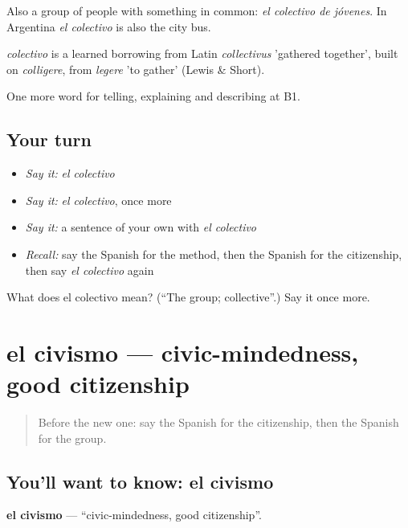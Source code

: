 Also a group of people with something in common: \emph{el colectivo de jóvenes}. In Argentina \emph{el colectivo} is also the city bus.

\begin{cousinweb}
\emph{colectivo} is a learned borrowing from Latin \emph{collectivus} 'gathered together', built on \emph{colligere}, from \emph{legere} 'to gather' (Lewis \& Short).
\end{cousinweb}

\begin{grammarlens}[title={What you've built}]
One more word for telling, explaining and describing at B1.
\end{grammarlens}

\subsection*{Your turn}
\begin{itemize}
\raggedright
  \item \emph{Say it:} \emph{el colectivo}
  \item \emph{Say it:} \emph{el colectivo}, once more
  \item \emph{Say it:} a sentence of your own with \emph{el colectivo}
  \item \emph{Recall:} say the Spanish for the method, then the Spanish for the citizenship, then say \emph{el colectivo} again
\end{itemize}

\begin{tcolorbox}[breakable,colback=teal!4,colframe=teal!35!black,title={Before you move on}]
What does el colectivo mean? (\textquotedblleft{}The group; collective\textquotedblright{}.) Say it once more.
\end{tcolorbox}
\section[el civismo]{el civismo — civic-mindedness, good citizenship}

\label{lesson:ES-C600-civismo}



\begin{quote}
Before the new one: say the Spanish for the citizenship, then the Spanish for the group.
\end{quote}

\subsection*{You'll want to know: el civismo}
\textbf{el civismo} — \textquotedblleft{}civic-mindedness, good citizenship\textquotedblright{}.

